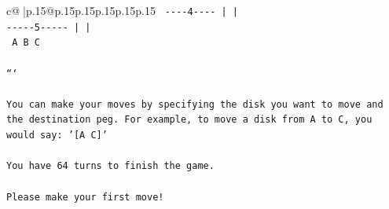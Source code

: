 \documentclass{article}
\begin{document}
{\begin{supertabular}{c@{$\;$}|p{.15\linewidth}@{}p{.15\linewidth}p{.15\linewidth}p{.15\linewidth}p{.15\linewidth}p{.15\linewidth}}
{{{\texttt{ {-}{-}{-}{-}4{-}{-}{-}{-}       |           |     } \\
\texttt{{-}{-}{-}{-}{-}5{-}{-}{-}{-}{-}      |           |     } \\
\texttt{     A           B           C     } \\
\\ 
\texttt{```} \\
\\ 
\texttt{You can make your moves by specifying the disk you want to move and the destination peg. For example, to move a disk from A to C, you would say: '{[}A C{]}'} \\
\\ 
\texttt{You have 64 turns to finish the game.} \\
\\ 
\texttt{Please make your first move!} \\
            }
        }
    }
     \\ \\


\end{supertabular}}
\end{document}
